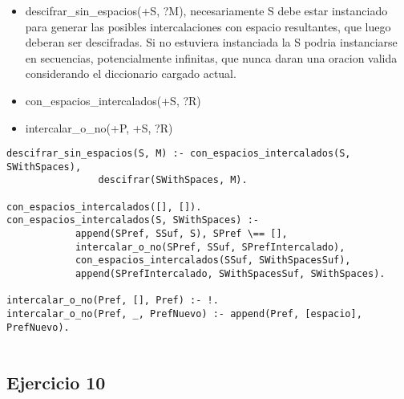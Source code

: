 \documentclass[spanish, 10pt,a4paper]{article}
\numberwithin{equation}{section} %
\begin{document}
\begin{itemize}
\item descifrar\_sin\_espacios(+S, ?M), necesariamente S debe estar instanciado para generar las posibles intercalaciones con espacio resultantes, que luego deberan ser descifradas.
Si no estuviera instanciada la S podria instanciarse en secuencias, potencialmente infinitas, que nunca daran una oracion valida considerando el diccionario cargado actual.
\item con\_espacios\_intercalados(+S, ?R)
\item intercalar\_o\_no(+P, +S, ?R)
\end{itemize}
\begin{lstlisting}
descifrar_sin_espacios(S, M) :- con_espacios_intercalados(S, SWithSpaces),  
				descifrar(SWithSpaces, M).

con_espacios_intercalados([], []).
con_espacios_intercalados(S, SWithSpaces) :- 
			append(SPref, SSuf, S), SPref \== [], 
			intercalar_o_no(SPref, SSuf, SPrefIntercalado), 
			con_espacios_intercalados(SSuf, SWithSpacesSuf), 
			append(SPrefIntercalado, SWithSpacesSuf, SWithSpaces).

intercalar_o_no(Pref, [], Pref) :- !. 
intercalar_o_no(Pref, _, PrefNuevo) :- append(Pref, [espacio], PrefNuevo).
											 
\end{lstlisting}


\subsection{Ejercicio 10}
\end{document}

